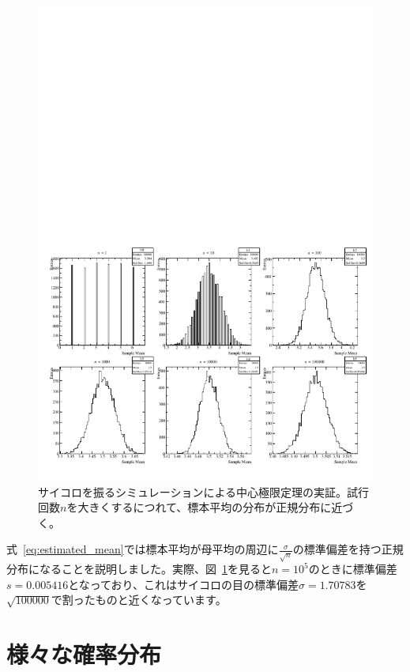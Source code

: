 \begin{figure}
  \centering
  \includegraphics[width=15cm]{fig/dice_central_limit_theorem.pdf}
  \caption{サイコロを振るシミュレーションによる中心極限定理の実証。試行回数$n$を大きくするにつれて、標本平均の分布が正規分布に近づく。}
  \label{fig:central_limit_theorem}
\end{figure}

式~\ref{eq:estimated_mean}では標本平均が母平均の周辺に$\frac{\sigma}{\sqrt{n}}$の標準偏差を持つ正規分布になることを説明しました。実際、図~\ref{fig:central_limit_theorem}を見ると$n=10^5$のときに標準偏差$s=0.005416$となっており、これはサイコロの目の標準偏差$\sigma=1.70783$を$\sqrt{100000}$で割ったものと近くなっています。

\section{様々な確率分布}

